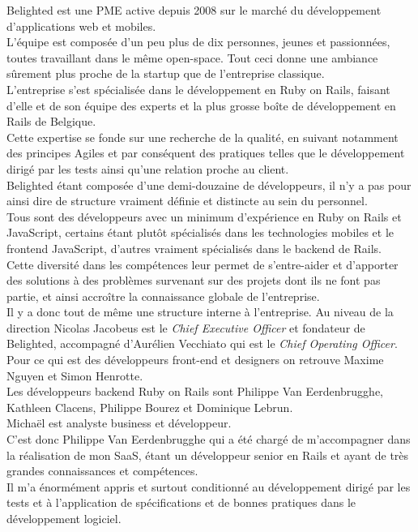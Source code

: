 \documentclass{report}
\begin{document}
  Belighted est une PME active depuis 2008 sur le marché du développement d'applications web et mobiles.\\
  L'équipe est composée d'un peu plus de dix personnes, jeunes et passionnées, toutes travaillant dans le même open-space. Tout ceci donne
  une ambiance sûrement plus proche de la startup que de l'entreprise classique.\\

  L'entreprise s'est spécialisée dans le développement en Ruby on Rails, faisant d'elle et de son équipe des experts et la plus grosse
  boîte de développement en Rails de Belgique.\\
  Cette expertise se fonde sur une recherche de la qualité, en suivant notamment des principes Agiles et par conséquent des pratiques
  telles que le développement dirigé par les tests ainsi qu'une relation proche au client.\\

  Belighted étant composée d'une demi-douzaine de développeurs, il n'y a pas pour ainsi dire de structure vraiment définie et distincte au sein du personnel. \\
  Tous sont des développeurs avec un minimum d'expérience en Ruby on Rails et JavaScript, certains étant plutôt spécialisés dans les technologies mobiles et le frontend JavaScript,
  d'autres vraiment spécialisés dans le backend de Rails. \\
  Cette diversité dans les compétences leur permet de s'entre-aider et d'apporter des solutions à des problèmes survenant sur des projets dont ils ne font pas partie, et ainsi
  accroître la connaissance globale de l'entreprise. \\

  Il y a donc tout de même une structure interne à l'entreprise. Au niveau de la direction Nicolas Jacobeus est le \textit{Chief Executive Officer} et fondateur de Belighted, accompagné
  d'Aurélien Vecchiato qui est le \textit{Chief Operating Officer}.\\
  Pour ce qui est des développeurs front-end et designers on retrouve Maxime Nguyen et Simon Henrotte. \\
  Les développeurs backend Ruby on Rails sont Philippe Van Eerdenbrugghe, Kathleen Clacens, Philippe Bourez et Dominique Lebrun.\\
  Michaël est analyste business et développeur.\\

  C'est donc Philippe Van Eerdenbrugghe qui a été chargé de m'accompagner dans la réalisation de mon SaaS, étant un développeur senior en Rails et ayant de très grandes connaissances et compétences.\\
  Il m'a énormément appris et surtout conditionné au développement dirigé par les tests et à l'application de spécifications et de bonnes pratiques dans le développement logiciel.\\
\end{document}
